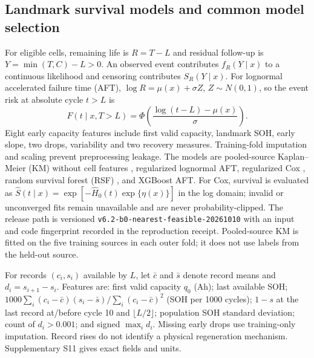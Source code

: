 \documentclass[preprint,12pt]{elsarticle}
\begin{document}
\subsection{Landmark survival models and common model selection}
For eligible cells, remaining life is $R=T-L$ and residual follow-up is $Y=\min(T,C)-L>0$. An observed event contributes $f_R(Y\mid x)$ to a continuous likelihood and censoring contributes $S_R(Y\mid x)$. For lognormal accelerated failure time (AFT), $\log R=\mu(x)+\sigma Z$, $Z\sim N(0,1)$, so the event risk at absolute cycle $t>L$ is
\begin{equation}F(t\mid x,T>L)=\Phi\left(\frac{\log(t-L)-\mu(x)}{\sigma}\right).\end{equation}
Eight early capacity features include first valid capacity, landmark SOH, early slope, two drops, variability and two recovery measures. Training-fold imputation and scaling prevent preprocessing leakage. The models are pooled-source Kaplan--Meier (KM) without cell features \citep{kaplan1958}, regularized lognormal AFT, regularized Cox \citep{cox1972}, random survival forest (RSF) \citep{ishwaran2008}, and XGBoost AFT. For Cox, survival is evaluated as $\widehat S(t\mid x)=\exp[-\widehat H_0(t)\exp\{\eta(x)\}]$ in the log domain; invalid or unconverged fits remain unavailable and are never probability-clipped. The release path is versioned \texttt{v6.2-b0-nearest-feasible-20261010} with an input and code fingerprint recorded in the reproduction receipt. Pooled-source KM is fitted on the five training sources in each outer fold; it does not use labels from the held-out source.


For records $(c_i,s_i)$ available by $L$, let $\bar c$ and $\bar s$ denote record means and $d_i=s_{i+1}-s_i$. Features are: first valid capacity $q_0$ (Ah); last available SOH; $1000\sum_i(c_i-\bar c)(s_i-\bar s)/\sum_i(c_i-\bar c)^2$ (SOH per 1000 cycles); $1-s$ at the last record at/before cycle 10 and $\lfloor L/2\rfloor$; population SOH standard deviation; count of $d_i>0.001$; and signed $\max_i d_i$. Missing early drops use training-only imputation. Record rises do not identify a physical regeneration mechanism. Supplementary S11 gives exact fields and units.
\end{document}
